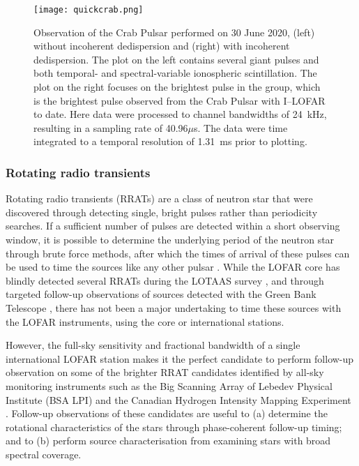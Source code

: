 \begin{figure}
    \centering
    \texttt{[image: quickcrab.png]}
    \caption[Observation of the Crab Pulsar performed on 30 June 2020.]{Observation of the Crab Pulsar performed on 30 June 2020, (left) without incoherent dedispersion and (right) with incoherent dedispersion. The plot on the left contains several giant pulses and both temporal- and spectral-variable ionospheric scintillation.  The plot on the right focuses on the brightest pulse in the group, which is the brightest pulse observed from the Crab Pulsar with I--LOFAR to date. Here data were processed to channel bandwidths of 24~kHz, resulting in a sampling rate of 40.96$\mu$s. The data were time integrated to a temporal resolution of 1.31~ms prior to plotting.}
    \label{fig:giant_pulse}
\end{figure}

\subsubsection{Rotating radio transients}\label{sec:rratsurvey}
Rotating radio transients (RRATs) are a class of neutron star that were discovered through detecting single, bright pulses rather than periodicity searches. If a sufficient number of pulses are detected within a short observing window, it is possible to determine the underlying period of the neutron star through brute force methods, after which the times of arrival of these pulses can be used to time the sources like any other pulsar \citep{Keane2011}. While the LOFAR core has blindly detected several RRATs during the LOTAAS survey \citep{Sanidas2019, Michilli2020, Tan2020}, and through targeted follow-up observations of sources detected with the Green Bank Telescope \citep{Karako-Argaman2015}, there has not been a major undertaking to time these sources with the LOFAR instruments, using the core or international stations.

However, the full-sky sensitivity and fractional bandwidth of a single international LOFAR station makes it the perfect candidate to perform follow-up observation on some of the brighter RRAT candidates identified by all-sky monitoring instruments such as the Big Scanning Array of Lebedev Physical Institute (BSA LPI) and the Canadian Hydrogen Intensity Mapping Experiment \citep[CHIME;][]{Amiri2018}. Follow-up observations of these candidates are useful to (a) determine the rotational characteristics of the stars through phase-coherent follow-up timing; and to (b) perform source characterisation from examining stars with broad spectral coverage.


